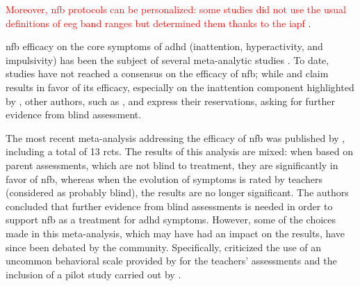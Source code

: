\textcolor{red}{Moreover, \gls{nfb} protocols can be personalized: some studies did not use the usual definitions of \gls{eeg} band ranges 
but determined them thanks to the \gls{iapf}} \citep{Liu2016, Escolano2014, Bazanova2018, Klimesch1999}.

\Gls{nfb} efficacy on the core symptoms of \gls{adhd} (inattention, hyperactivity, and impulsivity) has been the 
subject of several meta-analytic studies \citep{Loo2005, Lofthouse2012, Arns2009, Micoulaud2014, Sonuga-Barke2013}. 
To date, studies have not reached a consensus on the efficacy of \gls{nfb}; while \citet{Arns2009} and \citet{Micoulaud2014} 
claim results in favor of its efficacy, especially on the inattention component highlighted by \citeauthor{Micoulaud2014}, other authors, such as
\citet{Loo2005, Lofthouse2012}, and \citet{Sonuga-Barke2013} express their reservations, asking for further evidence from blind assessment.

The most recent meta-analysis addressing the efficacy of \gls{nfb} was published by \citet{Cortese2016}, including a total of 13
\glspl{rct}. The results of this analysis are mixed: when based on parent assessments, which are not blind to treatment, they are significantly 
in favor of \gls{nfb}, whereas when the evolution of symptoms is rated by teachers (considered as probably blind), the results are no longer 
significant. The authors concluded that further evidence from blind assessments is needed in order to support \gls{nfb} as a treatment for \gls{adhd} symptoms.
However, some of the choices made in this meta-analysis, which may have had an impact on the results, have since been debated by the community. Specifically, 
\citet{Micoulaud2016} criticized the use of an uncommon behavioral scale provided by \citet{Steiner2014} for the teachers' assessments 
and the inclusion of a pilot study carried out by \citet{Arnold2014}. 

